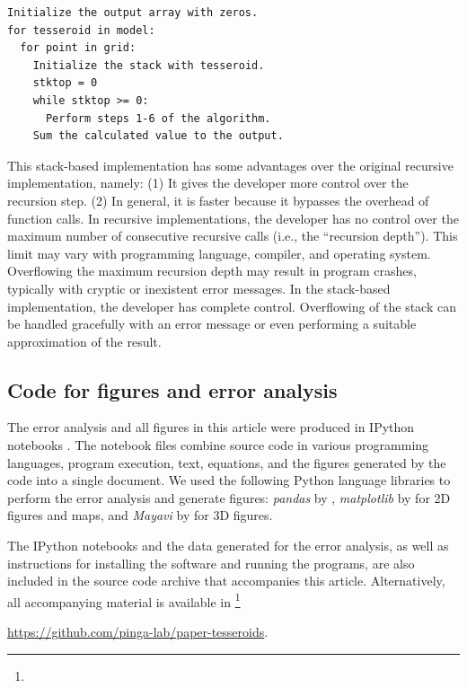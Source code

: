 \begin{verbatim}
Initialize the output array with zeros.
for tesseroid in model:
  for point in grid:
    Initialize the stack with tesseroid.
    stktop = 0
    while stktop >= 0:
      Perform steps 1-6 of the algorithm.
    Sum the calculated value to the output.
\end{verbatim}

This stack-based implementation
has some advantages over the original recursive implementation,
namely:
(1) It gives the developer more control over the recursion step.
(2) In general, it is faster because it bypasses the overhead of function
calls.
In recursive implementations,
the developer has no control over
the maximum number of consecutive recursive calls
(i.e., the ``recursion depth'').
This limit may vary with programming language,
compiler, and operating system.
Overflowing the maximum recursion depth
may result in program crashes,
typically with cryptic or inexistent error messages.
In the stack-based implementation,
the developer has complete control.
Overflowing of the stack can be handled gracefully
with an error message
or even performing a suitable approximation of the result.

\subsection{Code for figures and error analysis}


The error analysis and all figures in this article
were produced in IPython notebooks
\citep{perez2007}.
The notebook files combine source code in various programming languages,
program execution,
text, equations,
and the figures generated by the code
into a single document.
We used the following Python language libraries
to perform the error analysis and generate figures:
\emph{pandas} by \citet{mckinney2010},
\emph{matplotlib} by \citet{hunter2007} for 2D figures and maps,
and \emph{Mayavi} by \citet{ramachandran2011} for 3D figures.

The IPython notebooks
and the data generated for the error analysis,
as well as instructions for installing the software
and running the programs,
are also included in
the source code archive that accompanies this article.
Alternatively,
all accompanying material is available
in \DIFdelbegin {}\footnote{}%
\addtocounter{footnote}{-1}%
\DIFdelend \DIFaddbegin {}\url{https://github.com/pinga-lab/paper-tesseroids}\DIFaddend .



